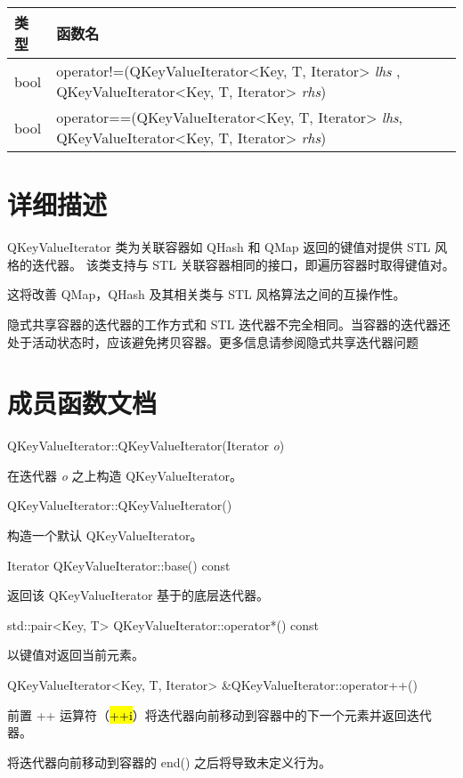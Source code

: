 \begin{tabular}{|l|m{30em}|}
\hline
类型 	&函数名\\
\hline
bool & operator!=(QKeyValueIterator<Key, T, Iterator> \emph{lhs
}, QKeyValueIterator<Key, T, Iterator> \emph{rhs}) \\ 
\hline
bool &	operator==(QKeyValueIterator<Key, T, Iterator> \emph{lhs}, QKeyValueIterator<Key, T, Iterator> \emph{rhs}) \\ 
\hline
\end{tabular}

\section{详细描述}

QKeyValueIterator 类为关联容器如 QHash 和 QMap 返回的键值对提供 STL 风格的迭代器。
该类支持与 STL 关联容器相同的接口，即遍历容器时取得键值对。

这将改善 QMap，QHash 及其相关类与 STL 风格算法之间的互操作性。

\begin{warning}
隐式共享容器的迭代器的工作方式和 STL 迭代器不完全相同。当容器的迭代器还处于活动状态时，应该避免拷贝容器。更多信息请参阅隐式共享迭代器问题
\end{warning}

\section{成员函数文档}

QKeyValueIterator::QKeyValueIterator(Iterator \emph{o})

在迭代器 \emph{o} 之上构造 QKeyValueIterator。

QKeyValueIterator::QKeyValueIterator()

构造一个默认 QKeyValueIterator。

Iterator QKeyValueIterator::base() const

返回该 QKeyValueIterator 基于的底层迭代器。

std::pair<Key, T> QKeyValueIterator::operator*() const

以键值对返回当前元素。

QKeyValueIterator<Key, T, Iterator> \&QKeyValueIterator::operator++()

前置 ++ 运算符（\hl{++i}）将迭代器向前移动到容器中的下一个元素并返回迭代器。

\begin{notice}
将迭代器向前移动到容器的 end() 之后将导致未定义行为。
\end{notice}

